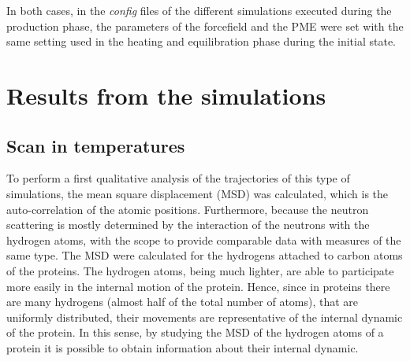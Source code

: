In both cases, in the \textit{config} files of the different simulations executed during the production phase, the parameters of the forcefield and the PME were set with the same setting used in the heating and equilibration phase during the initial state.

\section{Results from the simulations}
\subsection{Scan in temperatures}
To perform a first qualitative analysis of the trajectories of this type of simulations, the mean square displacement (MSD) was calculated, which is the auto-correlation of the atomic positions. Furthermore, because the neutron scattering is mostly determined by the interaction of the neutrons with the hydrogen atoms, with the scope to provide comparable data with measures of the same type. The MSD were calculated for the hydrogens attached to carbon atoms of the proteins. The hydrogen atoms, being much lighter, are able to participate more easily in the internal motion of the protein. Hence, since in proteins there are many hydrogens (almost half of the total number of atoms), that are uniformly distributed, their movements are representative of the internal dynamic of the protein. In this sense, by studying the MSD of the hydrogen atoms of a protein it is possible to obtain information about their internal dynamic.

